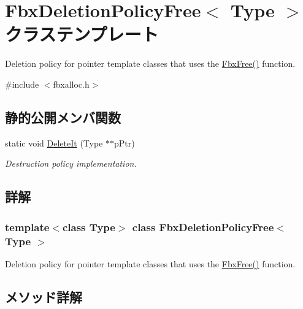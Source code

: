 \hypertarget{class_fbx_deletion_policy_free}{}\section{Fbx\+Deletion\+Policy\+Free$<$ Type $>$ クラステンプレート}
\label{class_fbx_deletion_policy_free}


Deletion policy for pointer template classes that uses the \hyperlink{fbxalloc_8h_a8252906713d55f4c56e7ba84221d3852}{Fbx\+Free()} function.  




{\ttfamily \#include $<$fbxalloc.\+h$>$}

\subsection*{静的公開メンバ関数}
\begin{DoxyCompactItemize}
\item 
static void \hyperlink{class_fbx_deletion_policy_free_a6b0c1df911d0480122de9bf31a4fd4a5}{Delete\+It} (Type $\ast$$\ast$p\+Ptr)
\begin{DoxyCompactList}\small\item\em Destruction policy implementation. \end{DoxyCompactList}\end{DoxyCompactItemize}


\subsection{詳解}
\subsubsection*{template$<$class Type$>$\newline
class Fbx\+Deletion\+Policy\+Free$<$ Type $>$}

Deletion policy for pointer template classes that uses the \hyperlink{fbxalloc_8h_a8252906713d55f4c56e7ba84221d3852}{Fbx\+Free()} function. 

\subsection{メソッド詳解}
\mbox{\label{class_fbx_deletion_policy_free_a6b0c1df911d0480122de9bf31a4fd4a5}} 
